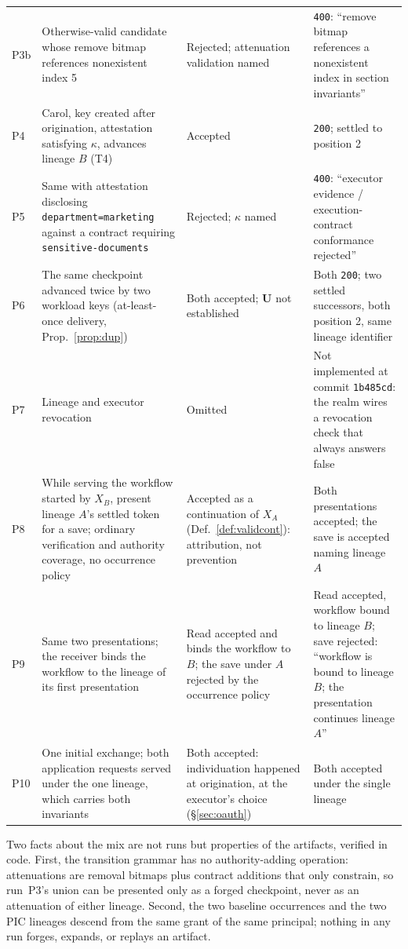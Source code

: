 \documentclass[conference]{IEEEtran}
\begin{document}
\begin{table}[!tp]
\begin{tabular}{@{}l>{\raggedright\arraybackslash}p{5.2cm}>{\raggedright\arraybackslash}p{3.6cm}>{\raggedright\arraybackslash}p{5.6cm}@{}}
P3b & Otherwise-valid candidate whose remove bitmap references nonexistent index 5 & Rejected; attenuation validation named & \texttt{400}: ``remove bitmap references a nonexistent index in section invariants'' \\
P4 & Carol, key created after origination, attestation satisfying $\kappa$, advances lineage $B$ (T4) & Accepted & \texttt{200}; settled to position 2 \\
P5 & Same with attestation disclosing \texttt{department=marketing} against a contract requiring \texttt{sensitive-documents} & Rejected; $\kappa$ named & \texttt{400}: ``executor evidence / execution-contract conformance rejected'' \\
P6 & The same checkpoint advanced twice by two workload keys (at-least-once delivery, Prop.~\ref{prop:dup}) & Both accepted; $\mathbf{U}$ not established & Both \texttt{200}; two settled successors, both position 2, same lineage identifier \\
P7 & Lineage and executor revocation & Omitted & Not implemented at commit \texttt{1b485cd}: the realm wires a revocation check that always answers false \\
P8 & While serving the workflow started by $X_B$, present lineage $A$'s settled token for a save; ordinary verification and authority coverage, no occurrence policy & Accepted as a continuation of $X_A$ (Def.~\ref{def:validcont}): attribution, not prevention & Both presentations accepted; the save is accepted naming lineage $A$ \\
P9 & Same two presentations; the receiver binds the workflow to the lineage of its first presentation & Read accepted and binds the workflow to $B$; the save under $A$ rejected by the occurrence policy & Read accepted, workflow bound to lineage $B$; save rejected: ``workflow is bound to lineage $B$; the presentation continues lineage $A$'' \\
P10 & One initial exchange; both application requests served under the one lineage, which carries both invariants & Both accepted: individuation happened at origination, at the executor's choice (\S\ref{sec:oauth}) & Both accepted under the single lineage \\
\bottomrule
\end{tabular}
\end{table}

Two facts about the mix are not runs but properties of the artifacts, verified in code. First, the transition grammar has no authority-adding operation: attenuations are removal bitmaps plus contract additions that only constrain, so run~P3's union can be presented only as a forged checkpoint, never as an attenuation of either lineage. Second, the two baseline occurrences and the two PIC lineages descend from the same grant of the same principal; nothing in any run forges, expands, or replays an artifact.
\end{document}
